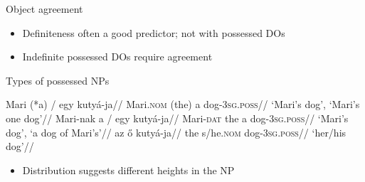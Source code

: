 \documentclass[12pt]{beamer}
\begin{document}
\begin{frame}{Object agreement}

    \begin{itemize}

        \item Definiteness often a good predictor; not with possessed DOs

        \item Indefinite possessed DOs require agreement

    \end{itemize}


\end{frame}

\begin{frame}{Types of possessed NPs}

\pex
    \a
        \begingl{}
            \gla    Mari {(*a) /} egy kutyá-ja//
            \glb    Mari.\textsc{nom} (the) a dog-\textsc{3sg.poss}//
            \glft   `Mari's dog', `Mari's one dog'//
        \endgl
    \pause
    \a
        \begingl{}
            \gla    Mari-nak {a /} egy kutyá-ja//
            \glb    Mari-\textsc{dat} the a dog-\textsc{3sg.poss}//
            \glft   `Mari's dog', `a dog of Mari's'//
        \endgl
    \pause
    \a
        \begingl{}
            \gla    az ő kutyá-ja//
            \glb    the s/he.\textsc{nom} dog-\textsc{3sg.poss}//
            \glft   `her/his dog'//
        \endgl
\xe

\pause

\begin{itemize}

    \item Distribution suggests different heights in the NP \parencite{denDikken1999,Bartos1999,Dekany2015}

\end{itemize}

\end{frame}
\end{document}
